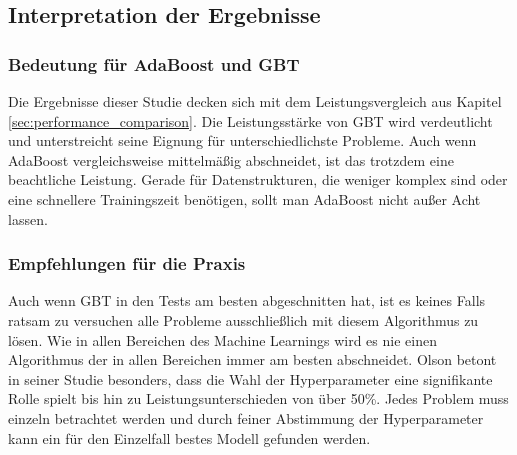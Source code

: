 \subsection{Interpretation der Ergebnisse}
\subsubsection{Bedeutung für AdaBoost und GBT}
Die Ergebnisse dieser Studie decken sich mit dem Leistungsvergleich aus Kapitel \ref{sec:performance_comparison}. Die Leistungsstärke von GBT wird verdeutlicht und unterstreicht seine Eignung für unterschiedlichste Probleme. Auch wenn AdaBoost vergleichsweise mittelmäßig abschneidet, ist das trotzdem eine beachtliche Leistung. Gerade für Datenstrukturen, die weniger komplex sind oder eine schnellere Trainingszeit benötigen, sollt man AdaBoost nicht außer Acht lassen.

\subsubsection{Empfehlungen für die Praxis}
Auch wenn GBT in den Tests am besten abgeschnitten hat, ist es keines Falls ratsam zu versuchen alle Probleme ausschließlich mit diesem Algorithmus zu lösen. Wie in allen Bereichen des Machine Learnings wird es nie einen Algorithmus der in allen Bereichen immer am besten abschneidet. Olson betont in seiner Studie besonders, dass die Wahl der Hyperparameter eine signifikante Rolle spielt bis hin zu Leistungsunterschieden von über 50\%. Jedes Problem muss einzeln betrachtet werden und durch feiner Abstimmung der Hyperparameter kann ein für den Einzelfall bestes Modell gefunden werden.